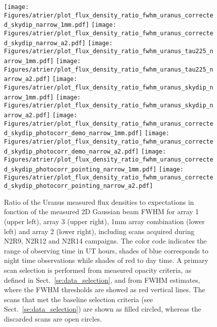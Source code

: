 \begin{figure}[ht!]
  \begin{center}
    \texttt{[image: Figures/atrier/plot\_flux\_density\_ratio\_fwhm\_uranus\_corrected\_skydip\_narrow\_1mm.pdf]}\hspace{0.2cm}
    \texttt{[image: Figures/atrier/plot\_flux\_density\_ratio\_fwhm\_uranus\_corrected\_skydip\_narrow\_a2.pdf]}
    \vspace{0.3cm}
    \texttt{[image: Figures/atrier/plot\_flux\_density\_ratio\_fwhm\_uranus\_tau225\_narrow\_1mm.pdf]}\hspace{0.2cm}
    \texttt{[image: Figures/atrier/plot\_flux\_density\_ratio\_fwhm\_uranus\_tau225\_narrow\_a2.pdf]}
    \vspace{0.3cm}
    \texttt{[image: Figures/atrier/plot\_flux\_density\_ratio\_fwhm\_uranus\_skydip\_narrow\_1mm.pdf]}\hspace{0.2cm}
    \texttt{[image: Figures/atrier/plot\_flux\_density\_ratio\_fwhm\_uranus\_skydip\_narrow\_a2.pdf]}
    \vspace{0.3cm}
    \texttt{[image: Figures/atrier/plot\_flux\_density\_ratio\_fwhm\_uranus\_corrected\_skydip\_photocorr\_demo\_narrow\_1mm.pdf]}\hspace{0.2cm}
    \texttt{[image: Figures/atrier/plot\_flux\_density\_ratio\_fwhm\_uranus\_corrected\_skydip\_photocorr\_demo\_narrow\_a2.pdf]}
    \vspace{0.3cm}
    \texttt{[image: Figures/atrier/plot\_flux\_density\_ratio\_fwhm\_uranus\_corrected\_skydip\_photocorr\_pointing\_narrow\_1mm.pdf]}\hspace{0.2cm}
    \texttt{[image: Figures/atrier/plot\_flux\_density\_ratio\_fwhm\_uranus\_corrected\_skydip\_photocorr\_pointing\_narrow\_a2.pdf]}
\caption[Uranus flux density stability against FWHM]{Ratio of the
  Uranus measured flux densities to expectations in fonction of the
  measured 2D
  Gaussian beam FWHM for array 1 (upper left), array 3 (upper right),
  1mm array combination (lower left) and array 2 (lower right),
  including scans acquired during N2R9, N2R12 and N2R14 campaigns. The
  color code indicates the range of observing time in UT hours, shades
  of blue corresponds to night time observations while shades of red
  to day time. A primary scan selection is performed from measured
  opacity criteria, as defined in Sect.~\ref{se:data_selection}, and
  from FWHM estimates, where the FWHM thresholds are showed as red vertical
  lines. The scans that met the baseline selection criteria (see
  Sect.~\ref{se:data_selection})
  are shown as filled circled, whereas the discarded scans are open circles.}
\label{fig:calib_uranus_vs_fwhm_all}
\end{center}
\end{figure}


